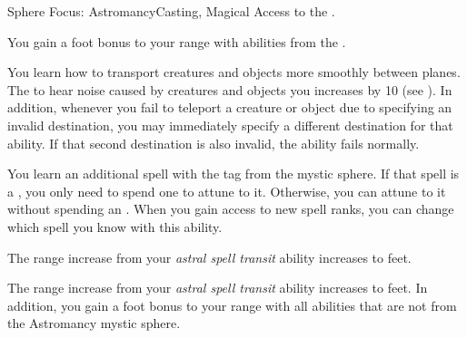     \begin{feat}{Sphere Focus: Astromancy}{Casting, Magical}
        \featpre Access to the  .

         You gain a  foot bonus to your range with abilities from the  .

         You learn how to transport creatures and objects more smoothly between planes.
        The  to hear noise caused by creatures and objects you  increases by 10 (see ).
        In addition, whenever you fail to teleport a creature or object due to specifying an invalid destination, you may immediately specify a different destination for that ability.
        If that second destination is also invalid, the ability fails normally.

         You learn an additional spell with the  tag from the  mystic sphere.
        If that spell is a , you only need to spend one  to attune to it.
        Otherwise, you can attune to it without spending an .
        When you gain access to new spell ranks, you can change which spell you know with this ability.

         The range increase from your \textit{astral spell transit} ability increases to  feet.

         The range increase from your \textit{astral spell transit} ability increases to  feet.
        In addition, you gain a  foot bonus to your range with all  abilities that are not from the Astromancy mystic sphere.
    \end{feat}

